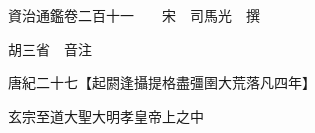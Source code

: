 










 


 
 


 

  
  
  
  
  





  
  
  
  
  
 
  

  

  
  
  



  

 
 

  
   




  

  
  


  　　資治通鑑卷二百十一　　宋　司馬光　撰

　　胡三省　音注

　　唐紀二十七【起閼逢攝提格盡彊圉大荒落凡四年】

　　玄宗至道大聖大明孝皇帝上之中

